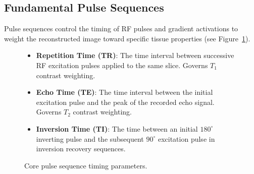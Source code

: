 \documentclass[11pt,a4paper]{article}
\begin{document}
\subsection{Fundamental Pulse Sequences}
Pulse sequences control the timing of RF pulses and gradient activations to weight the reconstructed image toward specific tissue properties (see Figure~\ref{fig:sequence_timing}).

\begin{figure}[htbp]
\centering
\begin{tcolorbox}[colback=gray!5!white,colframe=gray!50!black,arc=1mm,title=\sffamily Basic Pulse Sequence Parameters]
\small
\begin{itemize}
    \item \textbf{Repetition Time (TR)}: The time interval between successive RF excitation pulses applied to the same slice. Governs $T_1$ contrast weighting.
    \item \textbf{Echo Time (TE)}: The time interval between the initial excitation pulse and the peak of the recorded echo signal. Governs $T_2$ contrast weighting.
    \item \textbf{Inversion Time (TI)}: The time between an initial $180^\circ$ inverting pulse and the subsequent $90^\circ$ excitation pulse in inversion recovery sequences.
\end{itemize}
\end{tcolorbox}
\caption{Core pulse sequence timing parameters.}
\label{fig:sequence_timing}
\end{figure}
\end{document}
